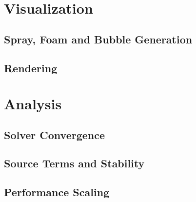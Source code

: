 \documentclass[oneside, a4paper]{book}
\begin{document}
\chapter{Visualization}\label{chp:visualization}
    \section{Spray, Foam and Bubble Generation}
    \section{Rendering}
\chapter{Analysis}\label{chp:analysis}
    \section{Solver Convergence}
    \section{Source Terms and Stability}
    \section{Performance Scaling}
\end{document}
